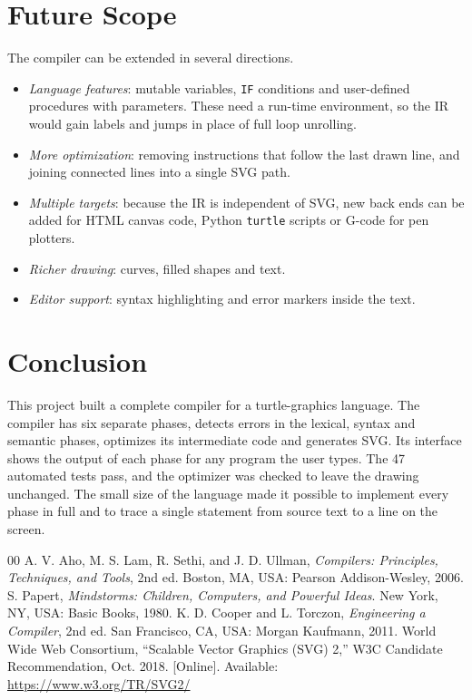 \documentclass[conference]{IEEEtran}
\newcommand{\kw}[1]{\texttt{#1}}
\begin{document}
\section{Future Scope}\label{sec:future}
The compiler can be extended in several directions.
\begin{itemize}
\item \textit{Language features}: mutable variables, \kw{IF} conditions and user-defined procedures with parameters. These need a run-time environment, so the IR would gain labels and jumps in place of full loop unrolling.
\item \textit{More optimization}: removing instructions that follow the last drawn line, and joining connected lines into a single SVG path.
\item \textit{Multiple targets}: because the IR is independent of SVG, new back ends can be added for HTML canvas code, Python \kw{turtle} scripts or G-code for pen plotters.
\item \textit{Richer drawing}: curves, filled shapes and text.
\item \textit{Editor support}: syntax highlighting and error markers inside the text.
\end{itemize}

\section{Conclusion}\label{sec:concl}
This project built a complete compiler for a turtle-graphics language. The compiler has six separate phases, detects errors in the lexical, syntax and semantic phases, optimizes its intermediate code and generates SVG. Its interface shows the output of each phase for any program the user types. The 47 automated tests pass, and the optimizer was checked to leave the drawing unchanged. The small size of the language made it possible to implement every phase in full and to trace a single statement from source text to a line on the screen.

\begin{thebibliography}{00}
 A. V. Aho, M. S. Lam, R. Sethi, and J. D. Ullman, \textit{Compilers: Principles, Techniques, and Tools}, 2nd ed. Boston, MA, USA: Pearson Addison-Wesley, 2006.
 S. Papert, \textit{Mindstorms: Children, Computers, and Powerful Ideas}. New York, NY, USA: Basic Books, 1980.
 K. D. Cooper and L. Torczon, \textit{Engineering a Compiler}, 2nd ed. San Francisco, CA, USA: Morgan Kaufmann, 2011.
 World Wide Web Consortium, ``Scalable Vector Graphics (SVG) 2,'' W3C Candidate Recommendation, Oct. 2018. [Online]. Available: \url{https://www.w3.org/TR/SVG2/}
\end{thebibliography}
\end{document}
